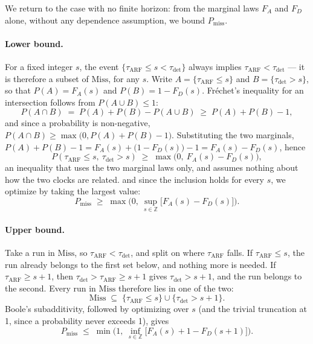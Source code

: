\documentclass[11pt,a4paper]{article}
\begin{document}
We return to the case with no finite horizon: from the marginal laws $F_A$ and $F_D$
alone, without any dependence assumption, we bound $P_{\mathrm{miss}}$.

\paragraph{Lower bound.} For a fixed integer $s$, the event
$\{\tau_{\mathrm{ARF}}\le s < \tau_{\mathrm{det}}\}$ always implies
$\tau_{\mathrm{ARF}}<\tau_{\mathrm{det}}$ --- it is therefore a subset of
$\mathrm{Miss}$, for any $s$. Write $A = \{\tau_{\mathrm{ARF}} \le s\}$ and
$B = \{\tau_{\mathrm{det}} > s\}$, so that $P(A) = F_A(s)$ and $P(B) = 1 - F_D(s)$.
Fréchet's inequality for an intersection follows from $P(A \cup B) \le 1$:
\[
  P(A \cap B) \;=\; P(A) + P(B) - P(A \cup B) \;\ge\; P(A) + P(B) - 1 ,
\]
and since a probability is non-negative, $P(A \cap B) \ge \max\big(0, P(A)+P(B)-1\big)$.
Substituting the two marginals, $P(A) + P(B) - 1 = F_A(s) + \bigl(1 - F_D(s)\bigr) - 1
= F_A(s) - F_D(s)$, hence
\[
  P(\tau_{\mathrm{ARF}}\le s,\ \tau_{\mathrm{det}}>s) \;\ge\; \max\big(0,\ F_A(s) - F_D(s)\big),
\]
an inequality that uses the two marginal laws only, and assumes nothing about how the two
clocks are related.
and since the inclusion holds for every $s$, we optimize by taking the largest value:
\[
  P_{\mathrm{miss}} \;\ge\; \max\Big(0,\ \sup_{s\in\mathbb{Z}} \big[F_A(s)-F_D(s)\big]\Big).
\]

\paragraph{Upper bound.} Take a run in $\mathrm{Miss}$, so $\tau_{\mathrm{ARF}} <
\tau_{\mathrm{det}}$, and split on where $\tau_{\mathrm{ARF}}$ falls. If
$\tau_{\mathrm{ARF}} \le s$, the run already belongs to the first set below, and nothing
more is needed. If $\tau_{\mathrm{ARF}} \ge s+1$, then $\tau_{\mathrm{det}} >
\tau_{\mathrm{ARF}} \ge s+1$ gives $\tau_{\mathrm{det}} > s+1$, and the run belongs to the
second. Every run in $\mathrm{Miss}$ therefore lies in one of the two:
\[
  \mathrm{Miss} \;\subseteq\; \{\tau_{\mathrm{ARF}}\le s\} \cup \{\tau_{\mathrm{det}}> s+1\}.
\]
Boole's subadditivity, followed by optimizing over $s$ (and the trivial truncation at
1, since a probability never exceeds 1), gives
\[
  P_{\mathrm{miss}} \;\le\; \min\Big(1,\ \inf_{s\in\mathbb{Z}} \big[F_A(s) + 1 - F_D(s+1)\big]\Big).
\]

\begin{center}
\end{center}
\end{document}
